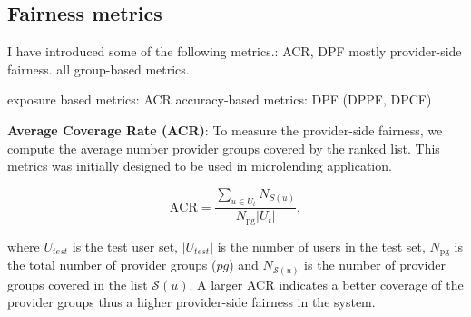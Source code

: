     \subsection{Fairness metrics}
    
        
        I have introduced some of the following metrics.: ACR, DPF
        mostly provider-side fairness.
        all group-based metrics.
        
        exposure based metrics: ACR
        accuracy-based metrics: DPF (DPPF, DPCF)
        
        
        
        \textbf{Average Coverage Rate (ACR)}: To measure the provider-side fairness, we compute the average number provider groups covered by the ranked list. This metrics was initially designed to be used in microlending application.
        
        \begin{equation}
            \text{ACR}=\frac{\sum_{u\in U_t}N_{S(u)}}{N_\text{pg}|U_t|},
        \end{equation}
        
        where $U_{test}$ is the test user set, $|U_{test}|$ is the number of users in the test set, $N_\text{pg}$ is the total number of provider groups ($pg$) and $N_{\mathcal{S}(u)}$ is the number of provider groups covered in the list $\mathcal{S}(u)$. A larger ACR indicates a better coverage of the provider groups thus a higher provider-side fairness in the system.
        
        
        
        
